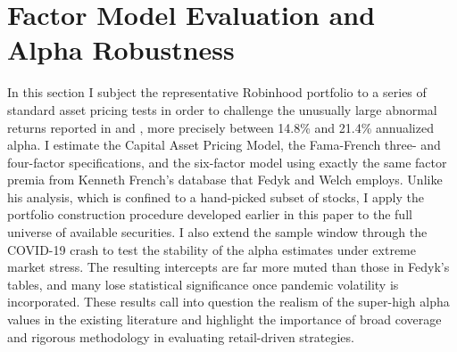 \section{Factor Model Evaluation and Alpha Robustness}
In this section I subject the representative Robinhood portfolio to a series of standard asset pricing tests in order to challenge the unusually large abnormal returns reported in \cite{Fedyk} and \cite{Welch2022}, 
more precisely between 14.8\% and 21.4\% annualized alpha.  
I estimate the Capital Asset Pricing Model, the Fama-French three- and four-factor specifications, and the six-factor model using exactly the same factor premia from Kenneth French's database that Fedyk and Welch employs.  
Unlike his analysis, which is confined to a hand-picked subset of stocks, I apply the portfolio construction procedure developed earlier in this paper to the full universe of available securities.  
I also extend the sample window through the COVID-19 crash to test the stability of the alpha estimates under extreme market stress.  
The resulting intercepts are far more muted than those in Fedyk's tables, and many lose statistical significance once pandemic volatility is incorporated.  
These results call into question the realism of the super-high alpha values in the existing literature and highlight the importance of broad coverage and rigorous methodology in evaluating retail-driven strategies.  
